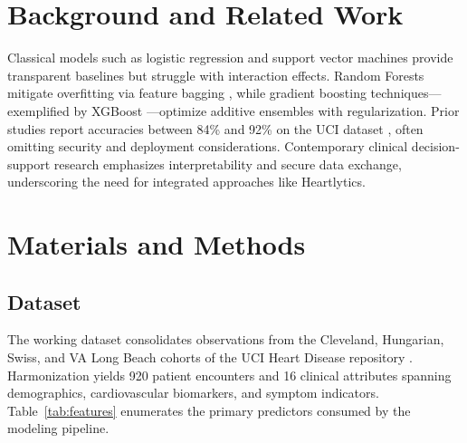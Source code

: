 \documentclass[12pt]{article}
\begin{document}
\section{Background and Related Work}
Classical models such as logistic regression and support vector machines provide transparent baselines but struggle with interaction effects. Random Forests mitigate overfitting via feature bagging \cite{breiman2001random}, while gradient boosting techniques---exemplified by XGBoost \cite{chen2016xgboost}---optimize additive ensembles with regularization. Prior studies report accuracies between 84\% and 92\% on the UCI dataset \cite{zhang2021heart}, often omitting security and deployment considerations. Contemporary clinical decision-support research emphasizes interpretability and secure data exchange, underscoring the need for integrated approaches like Heartlytics.

\section{Materials and Methods}
\label{sec:methods}
\subsection{Dataset}
The working dataset consolidates observations from the Cleveland, Hungarian, Swiss, and VA Long Beach cohorts of the UCI Heart Disease repository \cite{janosi1988uci}. Harmonization yields 920 patient encounters and 16 clinical attributes spanning demographics, cardiovascular biomarkers, and symptom indicators. Table~\ref{tab:features} enumerates the primary predictors consumed by the modeling pipeline.
\end{document}
